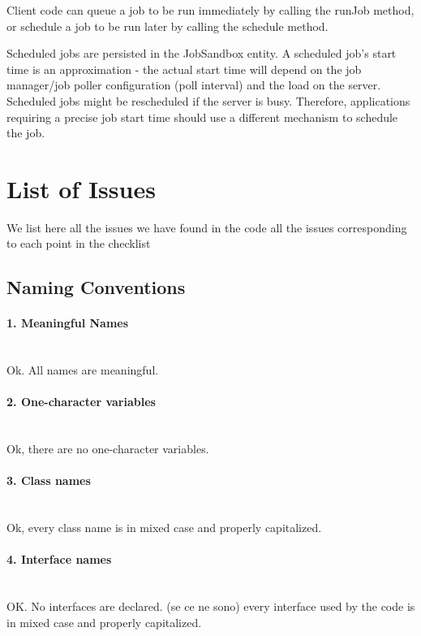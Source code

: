 \documentclass[english]{article}
\begin{document}
Client code can queue a job to be run immediately by calling the runJob method, or schedule a job to be run later by calling the schedule method. 

Scheduled jobs are persisted in the JobSandbox entity. A scheduled job's start time is an approximation - the actual start time will depend on the job manager/job poller configuration (poll interval) and the load on the server.
Scheduled jobs might be rescheduled if the server is busy. Therefore, applications requiring a precise job start time should use a different mechanism to schedule the job.

\section{List of Issues} %
We list here all the issues we have found in the code
all the issues corresponding to each point in the checklist


\subsection{Naming Conventions}

\paragraph{1. Meaningful Names}\\
Ok. All names are meaningful.

\paragraph{2. One-character variables}\\
Ok, there are no one-character variables.

\paragraph{3. Class names}\\
Ok, every class name is in mixed case and properly capitalized.

\paragraph{4. Interface names}\\
OK. No interfaces are declared.
(se ce ne sono) every interface used by the code is in mixed case and properly capitalized.
\end{document}
